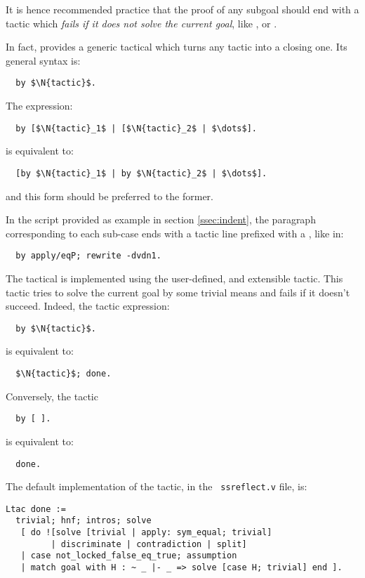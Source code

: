 It is hence recommended practice that the proof of any subgoal should
end with a tactic which \emph{fails if it does not solve the current
  goal}, like ,  or .

In fact, \ssr{} provides a generic tactical which turns any tactic into
a closing one. Its general syntax is:
\begin{lstlisting}
  by $\N{tactic}$.
\end{lstlisting}
The \Ltac{} expression:
\begin{lstlisting}
  by [$\N{tactic}_1$ | [$\N{tactic}_2$ | $\dots$].
\end{lstlisting}
is equivalent to:
\begin{lstlisting}
  [by $\N{tactic}_1$ | by $\N{tactic}_2$ | $\dots$].
\end{lstlisting}
and this form should be preferred to the former.

In the script provided as example in section \ref{ssec:indent}, the
paragraph corresponding to each sub-case ends with a tactic line prefixed
with a , like in:
\begin{lstlisting}
  by apply/eqP; rewrite -dvdn1.
\end{lstlisting}

The  tactical is implemented using the user-defined,
and extensible  tactic. This  tactic tries to solve
the current goal by some trivial means and fails if it doesn't succeed.
Indeed, the tactic expression:
\begin{lstlisting}
  by $\N{tactic}$.
\end{lstlisting}
is equivalent to:
\begin{lstlisting}
  $\N{tactic}$; done.
\end{lstlisting}
Conversely, the tactic
\begin{lstlisting}
  by [ ].
\end{lstlisting}
is equivalent to:
\begin{lstlisting}
  done.
\end{lstlisting}
The default implementation of the  tactic, in the {\tt
  ssreflect.v} file, is:

\begin{lstlisting}
Ltac done :=
  trivial; hnf; intros; solve
   [ do ![solve [trivial | apply: sym_equal; trivial]
         | discriminate | contradiction | split]
   | case not_locked_false_eq_true; assumption
   | match goal with H : ~ _ |- _ => solve [case H; trivial] end ].
\end{lstlisting}

